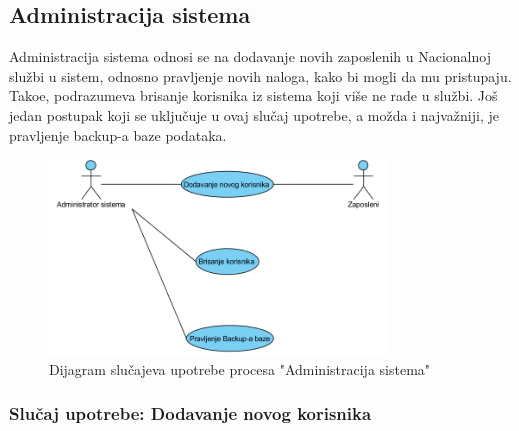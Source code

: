 \subsection{Administracija sistema}

Administracija sistema odnosi se na dodavanje novih zaposlenih u Nacionalnoj slu\v zbi u sistem, odnosno pravljenje novih naloga, kako bi mogli da mu pristupaju. Tako\dj e, podrazumeva brisanje korisnika iz sistema koji vi\v se ne rade u slu\v zbi. Jo\v s jedan postupak koji se uklju\v cuje u ovaj slu\v caj upotrebe, a mo\v zda i najva\v zniji, je pravljenje backup-a baze podataka.

\begin{figure}[H]
	\centering
	\includegraphics[width=0.8\textwidth]{dijagrami/dijagrami-slucajeva-upotrebe/administracija-sistema.png}
	\caption{Dijagram slu\v cajeva upotrebe procesa "Administracija sistema"}
	\label{dsu: administracija sistema}
\end{figure}

\subsubsection{Slu\v caj upotrebe: Dodavanje novog korisnika}

\label{su: dodavanje novog korisnika}

